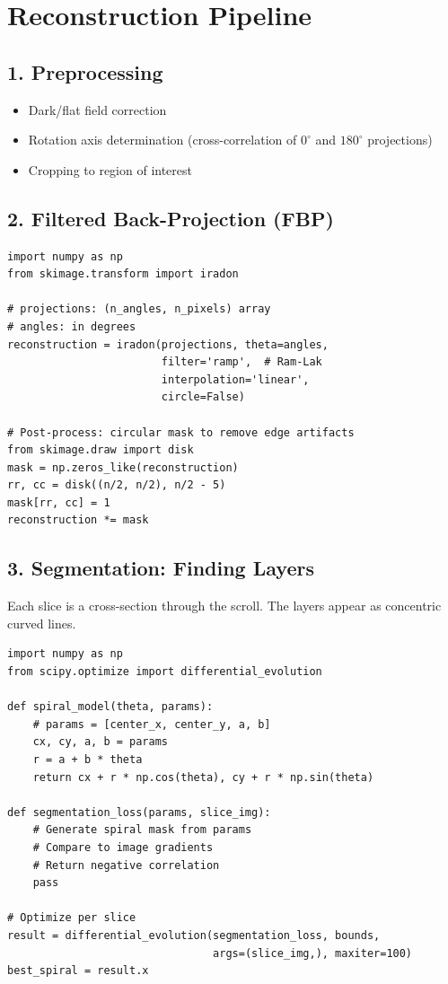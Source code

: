 \section{Reconstruction Pipeline}
\label{sec:tom:pipeline}

\subsection{1. Preprocessing}
\begin{itemize}
    \item Dark/flat field correction
    \item Rotation axis determination (cross-correlation of $0^\circ$ and $180^\circ$ projections)
    \item Cropping to region of interest
\end{itemize}

\subsection{2. Filtered Back-Projection (FBP)}
\begin{lstlisting}[style=python,caption=FBP reconstruction using iradon]
import numpy as np
from skimage.transform import iradon

# projections: (n_angles, n_pixels) array
# angles: in degrees
reconstruction = iradon(projections, theta=angles, 
                        filter='ramp',  # Ram-Lak
                        interpolation='linear',
                        circle=False)

# Post-process: circular mask to remove edge artifacts
from skimage.draw import disk
mask = np.zeros_like(reconstruction)
rr, cc = disk((n/2, n/2), n/2 - 5)
mask[rr, cc] = 1
reconstruction *= mask
\end{lstlisting}

\subsection{3. Segmentation: Finding Layers}
Each slice is a cross-section through the scroll. The layers appear as concentric curved lines.

\begin{lstlisting}[style=python,caption=Spiral segmentation via genetic algorithm]
import numpy as np
from scipy.optimize import differential_evolution

def spiral_model(theta, params):
    # params = [center_x, center_y, a, b]
    cx, cy, a, b = params
    r = a + b * theta
    return cx + r * np.cos(theta), cy + r * np.sin(theta)

def segmentation_loss(params, slice_img):
    # Generate spiral mask from params
    # Compare to image gradients
    # Return negative correlation
    pass

# Optimize per slice
result = differential_evolution(segmentation_loss, bounds,
                                args=(slice_img,), maxiter=100)
best_spiral = result.x
\end{lstlisting}

